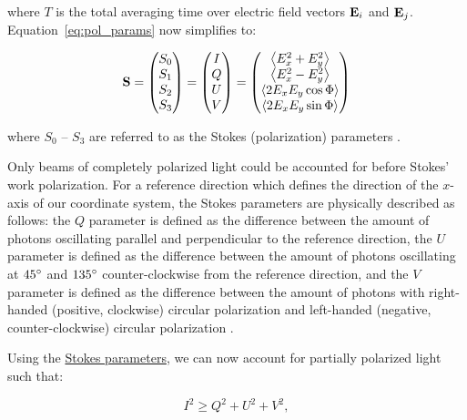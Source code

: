 \noindent where $T$ is the total averaging time over electric field vectors $\mathbf{E}_{i}$ and $\mathbf{E}_{j}$. Equation~\ref{eq:pol_params} now simplifies to:

\begin{equation}
  \mathbf{S} =
  \begin{pmatrix}
    S_{0} \\
    S_{1} \\
    S_{2} \\
    S_{3}
  \end{pmatrix}
  =
  \begin{pmatrix}
    I \\
    Q \\
    U \\
    V
  \end{pmatrix}
  =
  \begin{pmatrix}
    \left< E_{x}^{2} + E_{y}^{2} \right>   \\
    \left< E_{x}^{2} - E_{y}^{2} \right>   \\
    \left< 2 E_{x} E_{y} \cos \Phi \right> \\
    \left< 2 E_{x} E_{y} \sin \Phi \right>
  \end{pmatrix}
  \label{eq:Stokes_params}
\end{equation}

\noindent where $S_{0}$ -- $ S_{3}$ are referred to as the Stokes (polarization) parameters \citep{Stokes}.
\prgph

Only beams of completely polarized light could be accounted for before Stokes' work polarization. For a reference direction which defines the direction of the $x$-axis of our coordinate system, the Stokes parameters are physically described as follows: the $Q$ parameter is defined as the difference between the amount of photons oscillating parallel and perpendicular to the reference direction, the $U$ parameter is defined as the difference between the amount of photons oscillating at $45\hbox{$^\circ$}$ and $135\hbox{$^\circ$}$ counter-clockwise from the reference direction, and the $V$ parameter is defined as the difference between the amount of photons with right-handed (positive, clockwise) circular polarization and left-handed (negative, counter-clockwise) circular polarization \citep{Stokes}.
\prgph

Using the \hyperref[eq:Stokes_params]{Stokes parameters}, we can now account for partially polarized light such that:

\begin{equation}
  I^{2} \geq  Q^{2} + U^{2} + V^{2},
\end{equation}

